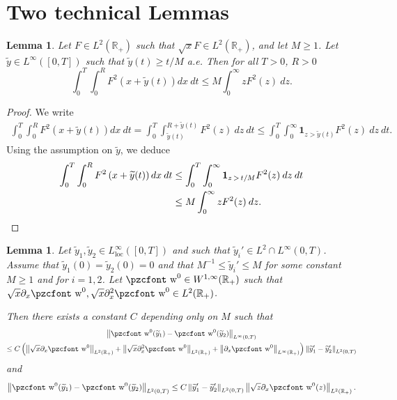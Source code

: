 \documentclass[10pt]{amsart}
\newtheorem{lemm}[theo]{Lemma}\newtheorem{prop}[theo]{Proposition}\newtheorem{coro}[theo]{Corollary}\newtheorem{conj}[theo]{Conjecture}
\theoremstyle{definition}\newtheorem{defi}[theo]{Definition}\newtheorem{rema}[theo]{Remark}\newtheorem{exam}[theo]{Example}\newtheorem{exem}[theo]{Example}\newtheorem{nota}[theo]{Notation}
\newcommand{\mathpzc}[1]{\text{\pzcfont #1}}
\newcommand{\R}{\mathbb{R}}
\newcommand{\p}{\partial}
\newcommand{\bfun}{\mathbf{1}}
\newcommand{\rloc}{\mathrm{loc}}
\newcommand{\tw}{\mathpzc{w}}
\newcommand{\ty}{\widetilde{y}}
\begin{document}
\section{Two technical Lemmas}
\begin{lemm}\label{lem:x+y}
Let $F\in L^2(\R_+)$ such that $\sqrt{x} F\in L^2(\R_+)$, and let $M\geq 1$. Let $\ty\in L^\infty([0,T])$ such that $\ty(t)\geq t/M$ a.e. Then for all $T>0$, $R>0$
\[
\int_0^T \int_0^R F^2\left(x+\ty(t)\right)dx\:dt\leq M\int_0^\infty z F^2(z)\:dz.
\]
\end{lemm}
\begin{proof}
We write
\begin{multline*}
\int_0^T \int_0^R F^2(x+\ty(t))dx\:dt
=\int_0^T\int_{\ty(t)}^{R+\ty(t)} F^2(z)\:dz\:dt
\leq \int_0^T \int_0^\infty \bfun_{z>\ty(t)} F^2(z)\:dz\: dt.
\end{multline*}
Using the assumption on $\ty$, we deduce
\begin{align*}
\int_0^T \int_0^R F^2\left(x+\ty(t)\right)dx\:dt &\leq \int_0^T \int_0^\infty \bfun_{z\,>\,t/M} F^2(z)\:dz\:dt\\
&\leq M\int_0^\infty z F^2(z)\:dz.\qedhere
\end{align*}
\end{proof}

\begin{lemm}\label{lem:Taylor}
Let $\ty_1, \ty_2\in L^\infty_\rloc([0,T])$ and such that $\ty_i'\in L^2\cap L^\infty(0,T)$. Assume that $\ty_1(0)=\ty_2(0)=0$ and that $M^{-1}\leq \ty_i'\leq M$ for some constant $M\geq 1$ and for $i=1,2$. Let $\tw^0\in W^{1,\infty}(\R_+)$ such that $\sqrt{x}\p_x \tw^0, \sqrt{x}\p_x^2 \tw^0\in L^2(\R_+)$.

Then there exists a constant $C$ depending only on $M$ such that
\begin{multline*}
\left\|\tw^0 (\ty_1)- \tw^0(\ty_2)\right\|_{L^\infty(0,T)}
\\
\leq C\left(\left\| \sqrt{x} \p_x \tw^0\right\|_{L^2(\R_+)} + \left\| \sqrt{x} \p_x^2 \tw^0\right\|_{L^2(\R_+)} + \left\|\p_x \tw^0\right\|_{L^\infty(\R_+)}\right) \left\|\ty_1'-\ty_2'\right\|_{L^2(0,T)}
\end{multline*}
and
\[
\left\|\tw^0 (\ty_1)- \tw^0(\ty_2)\right\|_{L^2(0,T)}\leq C \left\|\ty_1'-\ty_2'\right\|_{L^2(0,T)}\left\| \sqrt{z} \p_x \tw^0(z)\right\|_{L^2(\R_+)}.
\]
\end{lemm}
\end{document}
